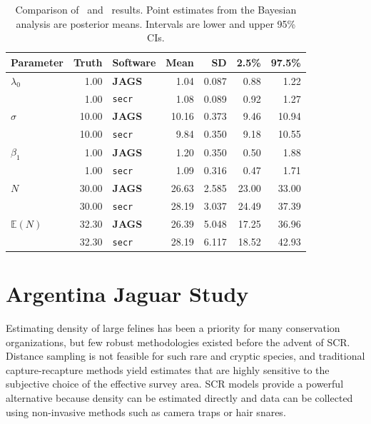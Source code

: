 \begin{table}%
\centering
\caption{Comparison of \secr~and \jags~results. Point estimates from
  the Bayesian analysis are posterior means. Intervals are lower and
  upper 95\% CIs.}
\begin{tabular}{lrlrrrr}
\hline
Parameter 	& Truth 	& Software 	& Mean 	& SD 	& 2.5\% & 97.5\% \\
\hline
 $\lambda_0$ 	&  1.00 	& \textbf{JAGS} 	&  1.04 	& 0.087 	&  0.88 	&  1.22 \\
                &  1.00 	& \texttt{secr} 	&  1.08 	& 0.089 	&  0.92 	&  1.27 \\
 $\sigma$ 	& 10.00 	& \textbf{JAGS} 	& 10.16 	& 0.373 	&  9.46 	& 10.94 \\
  	        & 10.00 	& \texttt{secr} 	&  9.84 	& 0.350 	&  9.18 	& 10.55 \\
 $\beta_1$ 	&  1.00 	& \textbf{JAGS} 	&  1.20 	& 0.350 	&  0.50 	&  1.88 \\
  	        &  1.00 	& \texttt{secr} 	&  1.09 	& 0.316 	&  0.47 	&  1.71 \\
 $N$ 	        & 30.00 	& \textbf{JAGS} 	& 26.63 	& 2.585 	& 23.00 	& 33.00 \\
  	        & 30.00 	& \texttt{secr} 	& 28.19 	& 3.037 	& 24.49 	& 37.39 \\
 $\mathbb{E}(N)$ 	& 32.30 	& \textbf{JAGS} 	& 26.39 	& 5.048 	& 17.25 	& 36.96 \\
  	        & 32.30 	& \texttt{secr} 	& 28.19 	& 6.117 	& 18.52 	& 42.93 \\
\hline
\end{tabular}
\label{state-space.tab.jagsVsecr}
\end{table}




\section{Argentina Jaguar Study}

Estimating density of large felines has been a priority for many
conservation organizations, but few robust methodologies existed before
the advent of SCR. Distance sampling is not feasible for such rare and
cryptic species, and traditional capture-recapture methods yield
estimates that are highly sensitive to the subjective choice of the
effective survey area. SCR models provide a powerful alternative
because density can be estimated directly and data can be collected
using non-invasive methods such as camera traps or hair snares.

